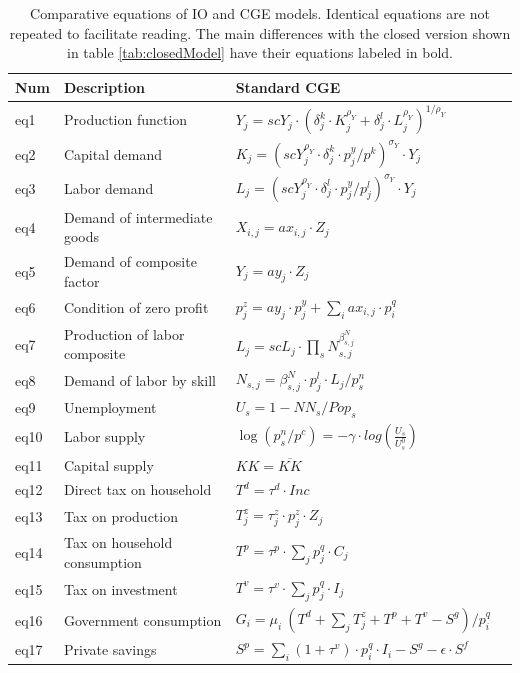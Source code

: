 


\begin{table}[!ht]
	\centering
	\caption{Comparative equations of IO and CGE models. Identical equations are not repeated to facilitate reading. The main differences with the closed version shown in table \ref{tab:closedModel} have their equations labeled in bold.}
	\label{tab:fullModel}
	\begin{tabular}{llll}
		\toprule
		Num & Description & Standard CGE  \\
		\midrule
		eq1 & Production function & $Y_j    = scY_j \cdot  ( \delta^k_j \cdot K_j^{\rho_Y} + \delta^l_j \cdot L_j^{\rho_Y} )^{1/\rho_Y}$ \\
		eq2 & Capital demand & $ K_j = (scY_j^{\rho_Y} \cdot  \delta^k_j \cdot  p^y_j / p^k )^{\sigma_Y} \cdot  Y_j $ \\
		eq3 & Labor demand  & $L_j = (scY_j^{\rho_Y} \cdot \delta^l_j \cdot  p^y_j / p^l_j )^{\sigma_Y} \cdot Y_j $ \\	
		eq4 & Demand of intermediate goods & $X_{i,j}  = ax_{i,j} \cdot Z_j$ \\
		eq5 & Demand of composite factor & $Y_j    = ay_j \cdot Z_j$ \\
		eq6 & Condition of zero profit & $p^z_j   = ay_j \cdot p^y_j + \sum_i ax_{i,j} \cdot p^q_i$ \\
		eq7 & Production of labor composite & $L_j    = scL_j \cdot  \prod_s N_{s,j}^{\beta^N_{s,j}}$  \\
		eq8 & Demand of labor by skill & $N_{s,j}  = \beta^N_{s,j} \cdot p^l_j \cdot  L_j / p^n_s$ \\
		eq9 & Unemployment & $ U_s =  1 - NN_s/Pop_s $\\
		eq10 & Labor supply & $\log( p^n_s / p^c ) = - \gamma \cdot  log(\frac{U_s}{U^0_s}) $  \\
		eq11 & Capital supply & $KK = \overline{KK} $  \\
		\midrule
		eq12 & Direct tax on household & $T^d = \tau^d \cdot Inc $\\
		eq13 & Tax on production & $T^z_j = \tau^z_j \cdot p^z_j \cdot Z_j$ \\
		eq14 & Tax on household consumption & $T^p = \tau^p \cdot \sum_j  p^q_j \cdot C_j $ \\
		eq15 & Tax on investment & $T^v = \tau^v \cdot \sum_j p^q_j\cdot I_j $ \\
		eq16 & Government consumption & $G_i = \mu_i ~ ( T^d + \sum_j T^z_j + T^p + T^v - S^g ) / p^q_i$ \\
		\midrule
		eq17 & Private savings & $S^p = \sum_i (1+\tau^v) \cdot p^q_i \cdot I_i - S^g - \epsilon \cdot S^f$ \\

\end{tabular}
\end{table}
